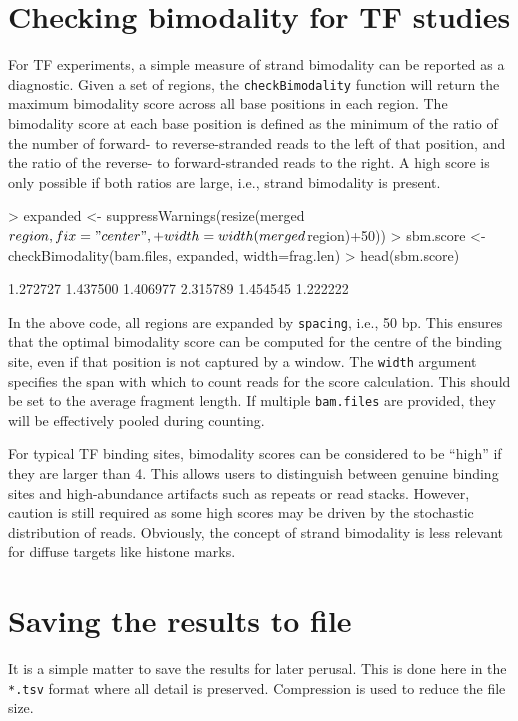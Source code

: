 \documentclass[12pt]{report}
\renewenvironment{Schunk}{\vspace{0pt}}{\vspace{0pt}}
\newcommand{\code}[1]{{\small\texttt{#1}}}
\begin{document}
\section{Checking bimodality for TF studies}
For TF experiments, a simple measure of strand bimodality can be reported as a diagnostic.
Given a set of regions, the \code{checkBimodality} function will return the maximum bimodality score across all base positions in each region.
The bimodality score at each base position is defined as the minimum of the ratio of the number of forward- to reverse-stranded reads to the left of that position, and the ratio of the reverse- to forward-stranded reads to the right.
A high score is only possible if both ratios are large, i.e., strand bimodality is present.

\begin{Schunk}
\begin{Sinput}
> expanded <- suppressWarnings(resize(merged$region, fix="center", 
+     width=width(merged$region)+50))
> sbm.score <- checkBimodality(bam.files, expanded, width=frag.len)
> head(sbm.score)
\end{Sinput}
\begin{Soutput}
[1] 1.272727 1.437500 1.406977 2.315789 1.454545 1.222222
\end{Soutput}
\end{Schunk}

In the above code, all regions are expanded by \code{spacing}, i.e., 50 bp.
This ensures that the optimal bimodality score can be computed for the centre of the binding site, even if that position is not captured by a window.
The \code{width} argument specifies the span with which to count reads for the score calculation.
This should be set to the average fragment length.
If multiple \code{bam.files} are provided, they will be effectively pooled during counting.

For typical TF binding sites, bimodality scores can be considered to be ``high'' if they are larger than 4.
This allows users to distinguish between genuine binding sites and high-abundance artifacts such as repeats or read stacks.
However, caution is still required as some high scores may be driven by the stochastic distribution of reads.
Obviously, the concept of strand bimodality is less relevant for diffuse targets like histone marks.

\section{Saving the results to file}
It is a simple matter to save the results for later perusal. 
This is done here in the \code{*.tsv} format where all detail is preserved. 
Compression is used to reduce the file size. 
\end{document}
